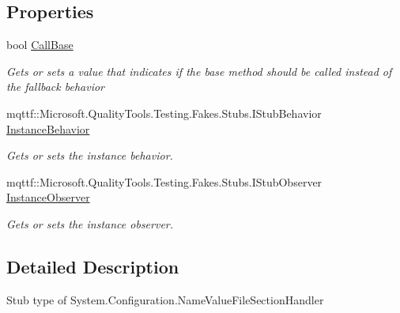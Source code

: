 \subsection*{Properties}
\begin{DoxyCompactItemize}
\item 
bool \hyperlink{class_system_1_1_configuration_1_1_fakes_1_1_stub_name_value_file_section_handler_a972c25befd802c8014e3577c242561a8}{Call\-Base}
\begin{DoxyCompactList}\small\item\em Gets or sets a value that indicates if the base method should be called instead of the fallback behavior\end{DoxyCompactList}\item 
mqttf\-::\-Microsoft.\-Quality\-Tools.\-Testing.\-Fakes.\-Stubs.\-I\-Stub\-Behavior \hyperlink{class_system_1_1_configuration_1_1_fakes_1_1_stub_name_value_file_section_handler_a8a1841e4191571aead985f42d6ae9ff7}{Instance\-Behavior}
\begin{DoxyCompactList}\small\item\em Gets or sets the instance behavior.\end{DoxyCompactList}\item 
mqttf\-::\-Microsoft.\-Quality\-Tools.\-Testing.\-Fakes.\-Stubs.\-I\-Stub\-Observer \hyperlink{class_system_1_1_configuration_1_1_fakes_1_1_stub_name_value_file_section_handler_a1e7fd381940f1f1678713d013154929f}{Instance\-Observer}
\begin{DoxyCompactList}\small\item\em Gets or sets the instance observer.\end{DoxyCompactList}\end{DoxyCompactItemize}


\subsection{Detailed Description}
Stub type of System.\-Configuration.\-Name\-Value\-File\-Section\-Handler



